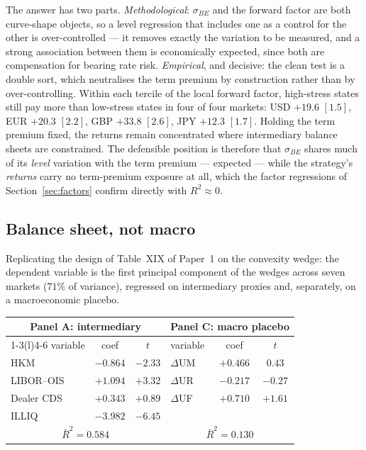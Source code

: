 \documentclass[11pt]{article}
\newcommand{\sBE}{\sigma_{BE}}
\begin{document}
The answer has two parts. \emph{Methodological}: $\sBE$ and the forward factor are both curve-shape
objects, so a level regression that includes one as a control for the other is over-controlled --- it
removes exactly the variation to be measured, and a strong association between them is economically
expected, since both are compensation for bearing rate risk. \emph{Empirical}, and decisive: the clean
test is a double sort, which neutralises the term premium by construction rather than by
over-controlling. Within each tercile of the local forward factor, high-stress states still pay more
than low-stress states in four of four markets: USD $+19.6$ $[1.5]$, EUR $+20.3$ $[2.2]$, GBP $+33.8$
$[2.6]$, JPY $+12.3$ $[1.7]$. Holding the term premium fixed, the returns remain concentrated where
intermediary balance sheets are constrained. The defensible position is therefore that $\sBE$ shares
much of its \emph{level} variation with the term premium --- expected --- while the strategy's
\emph{returns} carry no term-premium exposure at all, which the factor regressions of
Section~\ref{sec:factors} confirm directly with $R^2\approx 0$.

\subsection{Balance sheet, not macro}\label{sec:p5}
Replicating the design of Table~XIX of Paper~1 on the convexity wedge: the dependent variable is the
first principal component of the wedges across seven markets ($71\%$ of variance), regressed on
intermediary proxies and, separately, on a macroeconomic placebo.

\begin{center}
\begin{tabular}{lcc@{\hskip 2em}lcc}
\toprule
\multicolumn{3}{c}{Panel A: intermediary} & \multicolumn{3}{c}{Panel C: macro placebo}\\
\cmidrule(r){1-3}\cmidrule(l){4-6}
variable & coef & $t$ & variable & coef & $t$\\
\midrule
HKM        & $-0.864$ & $-2.33$ & $\Delta$UM & $+0.466$ & $0.43$\\
LIBOR--OIS & $+1.094$ & $+3.32$ & $\Delta$UR & $-0.217$ & $-0.27$\\
Dealer CDS & $+0.343$ & $+0.89$ & $\Delta$UF & $+0.710$ & $+1.61$\\
ILLIQ      & $-3.982$ & $-6.45$ &            &          &      \\
\midrule
\multicolumn{3}{c}{$\bar R^2 = 0.584$} & \multicolumn{3}{c}{$\bar R^2 = 0.130$}\\
\bottomrule
\end{tabular}
\end{center}
\end{document}
